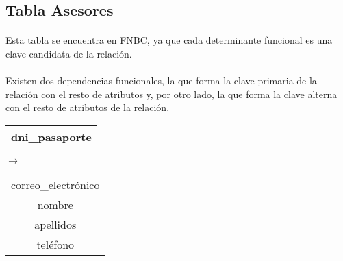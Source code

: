 \subsection{Tabla Asesores}

  \paragraph{}Esta tabla se encuentra en FNBC, ya que cada determinante
  funcional es una clave candidata de la relación.

  \paragraph{}Existen dos dependencias funcionales, la que forma la clave
  primaria de la relación con el resto de atributos y, por otro lado, la que
  forma la clave alterna con el resto de atributos de la relación.

  \begin{center}
    \begin{minipage}{3.7cm}{\begin{flushright}\begin{tabular}{ | c | }
                  \hline
                  dni\_pasaporte \\
                  \hline
                 \end{tabular}\end{flushright} }
    \end{minipage}
    \begin{minipage}{0.7cm}{$\longrightarrow$}
    \end{minipage}
    \begin{minipage}{5.9cm}{\begin{tabular}{ | c | }
                  \hline
                  correo\_electrónico \\
                  nombre \\
                  apellidos \\
                  teléfono \\
                  \hline
                 \end{tabular} }
    \end{minipage}
  \end{center}

